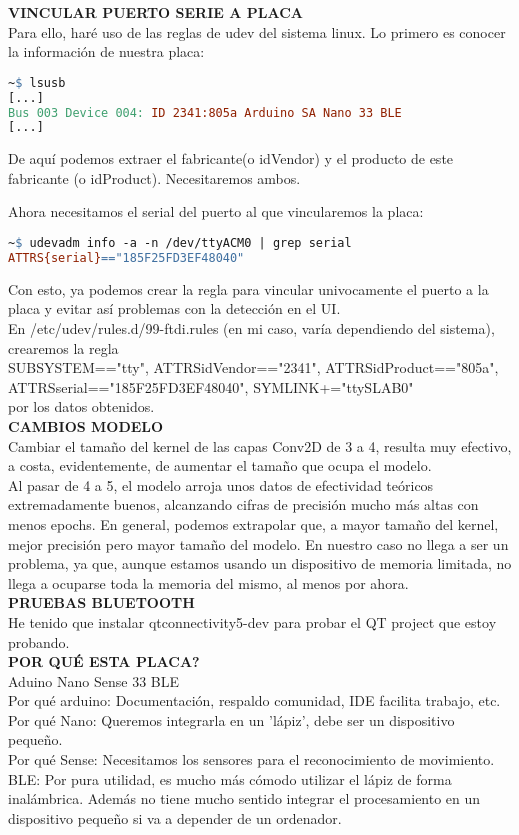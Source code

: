 \begin{mimargen}{-1cm}{-1cm}
\textbf{VINCULAR PUERTO SERIE A PLACA}\\
Para ello, haré uso de las reglas de udev del sistema linux.
Lo primero es conocer la información de nuestra placa:
\begin{lstlisting}[language=make]
  ~$ lsusb
[...]
Bus 003 Device 004: ID 2341:805a Arduino SA Nano 33 BLE
[...]
\end{lstlisting}
De aquí podemos extraer el fabricante(o idVendor) y el producto de este fabricante
(o idProduct). Necesitaremos ambos.

Ahora necesitamos el serial del puerto al que vincularemos la placa:
\begin{lstlisting}[language=make]
  ~$ udevadm info -a -n /dev/ttyACM0 | grep serial
ATTRS{serial}=="185F25FD3EF48040"
\end{lstlisting}
Con esto, ya podemos crear la regla para vincular univocamente el puerto a la placa
y evitar así problemas con la detección en el UI.\\
En /etc/udev/rules.d/99-ftdi.rules (en mi caso, varía dependiendo del sistema),
crearemos la regla \\SUBSYSTEM=="tty", ATTRS{idVendor}=="2341", ATTRS{idProduct}=="805a",
ATTRS{serial}=="185F25FD3EF48040", SYMLINK+="ttySLAB0"\\por los datos obtenidos.\\

\textbf{CAMBIOS MODELO}\\
Cambiar el tamaño del kernel de las capas Conv2D de 3 a 4, resulta muy efectivo,
a costa, evidentemente, de aumentar el tamaño que ocupa el modelo.\\
Al pasar de 4 a 5, el modelo arroja unos datos de efectividad teóricos extremadamente
buenos, alcanzando cifras de precisión mucho más altas con menos epochs.
En general, podemos extrapolar que, a mayor tamaño del kernel, mejor precisión pero
mayor tamaño del modelo. En nuestro caso no llega a ser un problema, ya que, aunque
estamos usando un dispositivo de memoria limitada, no llega a ocuparse toda la memoria
del mismo, al menos por ahora.\\

\textbf{PRUEBAS BLUETOOTH}\\
He tenido que instalar qtconnectivity5-dev para probar el QT project que estoy probando.\\

\textbf{POR QUÉ ESTA PLACA?}\\
Aduino Nano Sense 33 BLE\\
Por qué arduino: Documentación, respaldo comunidad, IDE facilita trabajo, etc.\\
Por qué Nano: Queremos integrarla en un 'lápiz', debe ser un dispositivo pequeño.\\
Por qué Sense: Necesitamos los sensores para el reconocimiento de movimiento.\\
BLE: Por pura utilidad, es mucho más cómodo utilizar el lápiz de forma inalámbrica.
Además no tiene mucho sentido integrar el procesamiento en un dispositivo pequeño
si va a depender de un ordenador.\\


\end{mimargen}
